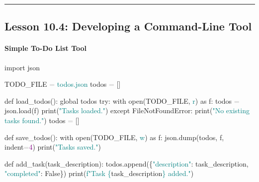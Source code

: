 \documentclass[
  justified,
  openright,
]{tufte-book}
\let\subsubsection\paragraph
\let\paragraph\paragraph
\newcommand{\BuiltInTok}[1]{#1}
\newcommand{\ControlFlowTok}[1]{\textcolor{BrandBlue}{#1}}
\newcommand{\DecValTok}[1]{\textcolor{Purple}{#1}}
\newcommand{\ImportTok}[1]{\textcolor{BrandAccent}{#1}}
\newcommand{\KeywordTok}[1]{\textcolor{BrandBlue}{#1}}
\newcommand{\NormalTok}[1]{#1}
\newcommand{\OperatorTok}[1]{\textcolor{DarkGray}{#1}}
\newcommand{\PreprocessorTok}[1]{\textcolor{BrandAccent}{#1}}
\newcommand{\SpecialCharTok}[1]{\textcolor{Teal}{#1}}
\newcommand{\SpecialStringTok}[1]{\textcolor{Teal}{#1}}
\newcommand{\StringTok}[1]{\textcolor{Teal}{#1}}
\newcommand{\VariableTok}[1]{#1}
\newenvironment{Shaded}{%
  \begin{snugshade}
}{%
  \end{snugshade}
}
\let\subsubsection\paragraph
\let\paragraph\paragraph
\begin{document}
\begin{center}\rule{0.5\linewidth}{0.5pt}\end{center}

\subsection{Lesson 10.4: Developing a Command-Line
Tool}\label{lesson-10.4-developing-a-command-line-tool}

\subsubsection{Simple To-Do List Tool}\label{simple-to-do-list-tool}

\begin{Shaded}
\begin{Highlighting}[]
\ImportTok{import}\NormalTok{ json}

\NormalTok{TODO\_FILE }\OperatorTok{=} \StringTok{\textquotesingle{}todos.json\textquotesingle{}}
\NormalTok{todos }\OperatorTok{=}\NormalTok{ []}


\KeywordTok{def}\NormalTok{ load\_todos():}
    \KeywordTok{global}\NormalTok{ todos}
    \ControlFlowTok{try}\NormalTok{:}
        \ControlFlowTok{with} \BuiltInTok{open}\NormalTok{(TODO\_FILE, }\StringTok{\textquotesingle{}r\textquotesingle{}}\NormalTok{) }\ImportTok{as}\NormalTok{ f:}
\NormalTok{            todos }\OperatorTok{=}\NormalTok{ json.load(f)}
        \BuiltInTok{print}\NormalTok{(}\StringTok{"Tasks loaded."}\NormalTok{)}
    \ControlFlowTok{except} \PreprocessorTok{FileNotFoundError}\NormalTok{:}
        \BuiltInTok{print}\NormalTok{(}\StringTok{"No existing tasks found."}\NormalTok{)}
\NormalTok{        todos }\OperatorTok{=}\NormalTok{ []}


\KeywordTok{def}\NormalTok{ save\_todos():}
    \ControlFlowTok{with} \BuiltInTok{open}\NormalTok{(TODO\_FILE, }\StringTok{\textquotesingle{}w\textquotesingle{}}\NormalTok{) }\ImportTok{as}\NormalTok{ f:}
\NormalTok{        json.dump(todos, f, indent}\OperatorTok{=}\DecValTok{4}\NormalTok{)}
    \BuiltInTok{print}\NormalTok{(}\StringTok{"Tasks saved."}\NormalTok{)}


\KeywordTok{def}\NormalTok{ add\_task(task\_description):}
\NormalTok{    todos.append(\{}\StringTok{"description"}\NormalTok{: task\_description, }\StringTok{"completed"}\NormalTok{: }\VariableTok{False}\NormalTok{\})}
    \BuiltInTok{print}\NormalTok{(}\SpecialStringTok{f"Task \textquotesingle{}}\SpecialCharTok{\{}\NormalTok{task\_description}\SpecialCharTok{\}}\SpecialStringTok{\textquotesingle{} added."}\NormalTok{)}



\end{Highlighting}
\end{Shaded}
\end{document}
